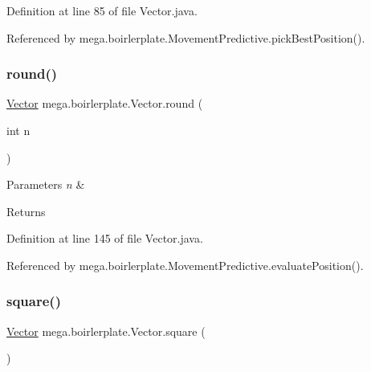Definition at line 85 of file Vector.\+java.



Referenced by mega.\+boirlerplate.\+Movement\+Predictive.\+pick\+Best\+Position().

\mbox{\label{classmega_1_1boirlerplate_1_1_vector_ae22004e952a4956f1d190b95cb82b6f8}} 
\subsubsection{\texorpdfstring{round()}{round()}}
{\footnotesize\ttfamily \hyperlink{classmega_1_1boirlerplate_1_1_vector}{Vector} mega.\+boirlerplate.\+Vector.\+round (\begin{DoxyParamCaption}\item[{int}]{n }\end{DoxyParamCaption})}


\begin{DoxyParams}{Parameters}
{\em n} & \\
\hline
\end{DoxyParams}
\begin{DoxyReturn}{Returns}

\end{DoxyReturn}


Definition at line 145 of file Vector.\+java.



Referenced by mega.\+boirlerplate.\+Movement\+Predictive.\+evaluate\+Position().

\mbox{\label{classmega_1_1boirlerplate_1_1_vector_af5fc9e67442b69c1ca3c6a539923efa3}} 
\subsubsection{\texorpdfstring{square()}{square()}}
{\footnotesize\ttfamily \hyperlink{classmega_1_1boirlerplate_1_1_vector}{Vector} mega.\+boirlerplate.\+Vector.\+square (\begin{DoxyParamCaption}{ }\end{DoxyParamCaption})}

